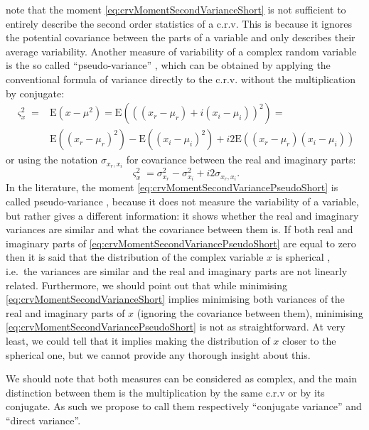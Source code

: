 \documentclass[
]{book}
\begin{document}
\citet{Picinbono} note that the moment \eqref{eq:crvMomentSecondVarianceShort} is not sufficient to entirely describe the second order statistics of a c.r.v. This is because it ignores the potential covariance between the parts of a variable and only describes their average variability. Another measure of variability of a complex random variable is the so called ``pseudo-variance'' \citep{reference}, which can be obtained by applying the conventional formula of variance directly to the c.r.v. without the multiplication by conjugate:
\begin{equation}
    \begin{aligned}
    \varsigma_x^2 = & \mathrm{E}(x-\mu^2) = \mathrm{E}\left(((x_r-\mu_{r}) + i (x_i-\mu_{i}))^2\right) = \\
                    & \mathrm{E}((x_r-\mu_{r})^2) - \mathrm{E}((x_i-\mu_{i})^2) + i2 \mathrm{E}((x_r-\mu_{r})(x_i-\mu_{i}))
    \end{aligned}
    \label{eq:crvMomentSecondVariancePseudo}
\end{equation}
or using the notation \(\sigma_{x_r,x_i}\) for covariance between the real and imaginary parts:
\begin{equation}
    \varsigma_x^2 = \sigma_{x_r}^2 - \sigma_{x_i}^2 + i2 \sigma_{x_r,x_i}.
    \label{eq:crvMomentSecondVariancePseudoShort}
\end{equation}
In the literature, the moment \eqref{eq:crvMomentSecondVariancePseudoShort} is called pseudo-variance \citep{reference}, because it does not measure the variability of a variable, but rather gives a different information: it shows whether the real and imaginary variances are similar and what the covariance between them is. If both real and imaginary parts of \eqref{eq:crvMomentSecondVariancePseudoShort} are equal to zero then it is said that the distribution of the complex variable \(x\) is spherical \citep{reference}, i.e.~the variances are similar and the real and imaginary parts are not linearly related. Furthermore, we should point out that while minimising \eqref{eq:crvMomentSecondVarianceShort} implies minimising both variances of the real and imaginary parts of \(x\) (ignoring the covariance between them), minimising \eqref{eq:crvMomentSecondVariancePseudoShort} is not as straightforward. At very least, we could tell that it implies making the distribution of \(x\) closer to the spherical one, but we cannot provide any thorough insight about this.

We should note that both measures can be considered as complex, and the main distinction between them is the multiplication by the same c.r.v or by its conjugate. As such we propose to call them respectively ``conjugate variance'' and ``direct variance''.
\end{document}
